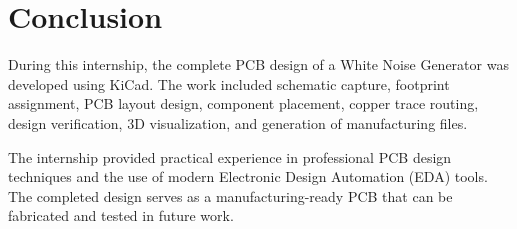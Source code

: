 
\section{Conclusion}

During this internship, the complete PCB design of a White Noise Generator was developed using KiCad. The work included schematic capture, footprint assignment, PCB layout design, component placement, copper trace routing, design verification, 3D visualization, and generation of manufacturing files.

The internship provided practical experience in professional PCB design techniques and the use of modern Electronic Design Automation (EDA) tools. The completed design serves as a manufacturing-ready PCB that can be fabricated and tested in future work.

